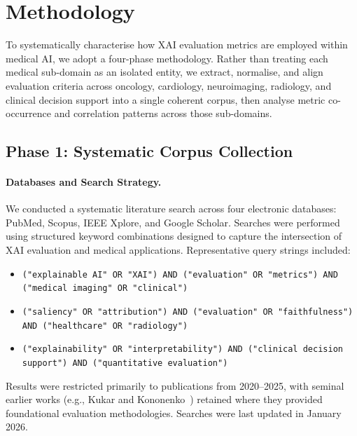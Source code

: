 \section{Methodology}

To systematically characterise how XAI evaluation metrics are employed within
medical AI, we adopt a four-phase methodology. Rather than treating each
medical sub-domain as an isolated entity, we extract, normalise, and
align evaluation criteria across oncology, cardiology, neuroimaging, radiology, and
clinical decision support into a single coherent corpus, then analyse metric co-occurrence
and correlation patterns across those sub-domains.

\subsection{Phase 1: Systematic Corpus Collection}

\paragraph{Databases and Search Strategy.}
We conducted a systematic literature search across four electronic databases: PubMed, Scopus, IEEE Xplore, and Google Scholar. Searches were performed using structured keyword combinations designed to capture the intersection of XAI evaluation and medical applications. Representative query strings included:

\begin{itemize}
    \item \texttt{("explainable AI" OR "XAI") AND ("evaluation" OR "metrics") AND ("medical imaging" OR "clinical")}
    \item \texttt{("saliency" OR "attribution") AND ("evaluation" OR "faithfulness") AND ("healthcare" OR "radiology")}
    \item \texttt{("explainability" OR "interpretability") AND ("clinical decision support") AND ("quantitative evaluation")}
\end{itemize}

Results were restricted primarily to publications from 2020--2025, with seminal earlier works (e.g., Kukar and Kononenko~\cite{Kukar2011}) retained where they provided foundational evaluation methodologies. Searches were last updated in January 2026.

